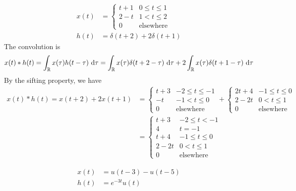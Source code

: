\documentclass{article}
\begin{document}
\question{}

\begin{align}
    x(t) &=
    \begin{cases}
        t + 1 & 0 \leqslant t \leqslant 1 \\
        2 - t & 1 < t \leqslant 2 \\
        0 & \text{elsewhere}
    \end{cases} \\
    h(t) &= \delta(t + 2) + 2 \delta(t + 1)
\end{align}
The convolution is
\begin{equation}
    x(t) \ast h(t) = \int_{\mathbb{R}} x(\tau) h(t - \tau) \, \dd{\tau} = \int_{\mathbb{R}} x(\tau) \delta(t + 2 - \tau) \, \dd{\tau} + 2 \int_{\mathbb{R}} x(\tau) \delta(t + 1 - \tau) \, \dd{\tau}
\end{equation}
By the sifting property, we have
\begin{align}
    x(t) \ast h(t) = x(t + 2) + 2x(t + 1) &=
    \begin{cases}
        t + 3 & -2 \leqslant t \leqslant -1 \\
        -t & -1 < t \leqslant 0 \\
        0 & \text{elsewhere}
    \end{cases} +
    \begin{cases}
        2t + 4 & -1 \leqslant t \leqslant 0 \\
        2 - 2t & 0 < t \leqslant 1 \\
        0 & \text{elsewhere}
    \end{cases} \\
    &=
    \begin{cases}
        t + 3 & -2 \leqslant t < -1 \\
        4 & t = -1 \\
        t + 4 & -1 \leqslant t \leqslant 0 \\
        2 - 2t & 0 < t \leqslant 1 \\
        0 & \text{elsewhere}
    \end{cases}
\end{align}
\begin{center}
    \resizebox{0.8\textwidth}{!}{}
\end{center}

\question{}

\begin{align}
    x(t) &= u(t - 3) - u(t - 5) \\
    h(t) &= e^{-3t} u(t)
\end{align}
\end{document}
